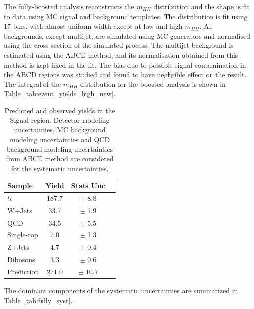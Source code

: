 The fully-boosted analysis reconstructs the ${m_{HH}}$ distribution and the shape is fit to data using MC signal and background templates. The distribution is fit using 17
bins, with almost uniform width except at low and high $m_{HH}$. %
All backgrounds, except multijet, are
simulated using MC generators and normalised using the cross section of the
simulated process. The multijet background is estimated using the ABCD
method, and its normalisation obtained from this method is kept fixed in the fit. The bias due
to possible signal contamination in the ABCD regions was studied
and found to have negligible effect on the result.  The integral of the $m_{HH}$
distribution for the boosted analysis is shown in
Table~\ref{tab:event_yields_high_new}.
\renewcommand{\arraystretch}{1.5}
\begin{table}
\begin{center}
\begin{tabular}{l|c|c|c}
\hline
Sample        &  Yield   &  Stats Unc \\ 
\hline 
$t\bar{t}$    &  187.7  & $\pm$ 8.8    \\
W+Jets        &  33.7   & $\pm$ 1.9     \\
QCD           &  34.5   & $\pm$ 5.5     \\
Single-top    &  7.0   & $\pm$ 1.3     \\
Z+Jets        &  4.7    & $\pm$ 0.4        \\
Dibosons      &  3.3    & $\pm$ 0.6      \\
\hline
Prediction    &  271.0  & $\pm$ 10.7       \\
\hline
\end{tabular}
\end{center}
\caption[Predicted and observed yields in the Signal region]{Predicted and observed yields in the Signal region. Detector modeling
uncertainties, MC background modeling uncertainties and QCD background modeling uncertainties
from ABCD method are considered for the systematic uncertainties.}
\label{tab:boosted_bkgd_mbbcr_yields_new}
\end{table}
\renewcommand{\arraystretch}{1.0}
 
The dominant components of the systematic uncertainties are summarized in Table~\ref{tab:fully_syst}.
\newpage

